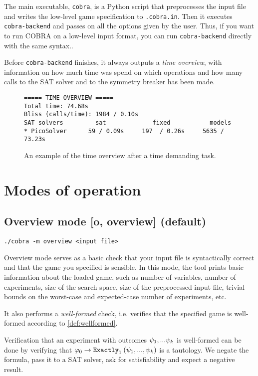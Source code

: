 The main executable, \texttt{cobra}, is a Python script that preprocesses
  the input file and writes the low-level game specification to \texttt{.cobra.in}.
Then it executes \texttt{cobra-backend} and passes on all the options given
  by the user.
Thus, if you want to run COBRA on a low-level input format, you can run
  \texttt{cobra-backend} directly with the same syntax..

Before \texttt{cobra-backend} finishes, it always outputs a \emph{time overview},
  with information on how much time was spend on which operations and
  how many calls to the SAT solver and to the symmetry breaker has been made.

\begin{figure}[h]
\begin{lstlisting}
===== TIME OVERVIEW =====
Total time: 74.68s
Bliss (calls/time): 1984 / 0.10s
SAT solvers         sat             fixed           models
* PicoSolver      59 / 0.09s     197  / 0.26s     5635 / 73.23s
\end{lstlisting}
\caption{An example of the time overview after a time demanding task.}
\label{fig:timeoverview}
\end{figure}


\section{Modes of operation}\label{s:cobra-modes}

\subsection{Overview mode [o, overview] (default)}

\centerline{\texttt{./cobra -m overview <input file> }}
\medskip

Overview mode serves as a basic check that your input file is
  syntactically correct and that the game you specified is sensible.
In this mode, the tool prints basic information about the loaded game, such as
  number of variables, number of experiments, size of the search space,
  size of the preprocessed input file,
  trivial bounds on the worst-case and expected-case number of experiments, etc.

It also performs a \emph{well-formed} check, i.e. verifies that the
  specified game is well-formed according to \autoref{def:wellformed}.

Verification that an experiment with outcomes $\psi_1,...\psi_k$ is well-formed
  can be done by verifying that $\varphi_0->\mathtt{Exactly}_{1}\:(\psi_1, ..., \psi_k)$
  is a tautology.
We negate the formula, pass it to a SAT solver, ask for satisfiability and expect a negative result.

